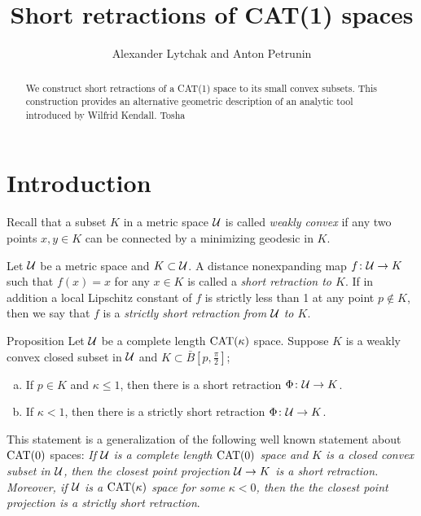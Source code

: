 \documentclass[oneside,a4paper, 12pt]{article}
\begin{document}
\title{Short retractions of CAT(1) spaces}
\author{Alexander Lytchak and Anton Petrunin}
\date{}
\maketitle

\begin{abstract}
We construct short retractions of a CAT(1) space to its small convex subsets.
This construction provides an alternative geometric description of an analytic tool introduced by Wilfrid Kendall. Tosha 
\end{abstract}


\section{Introduction}

Recall that a  subset $K$ in a metric space ${\mathcal{U}}$ is called \emph{weakly convex} if any two points $x,y\in K$ can be connected by a minimizing geodesic in $K$.

Let ${\mathcal{U}}$ be a metric space and $K\subset {\mathcal{U}}$.
A distance nonexpanding map $f\colon{\mathcal{U}}\to K$ such that $f(x)=x$ for any $x\in K$ is called a \emph{short retraction to $K$}.
If in addition a local Lipschitz constant of $f$ is strictly less than 1 at any point $p\notin K$, 
then we say that $f$ is a \emph{strictly short retraction from ${\mathcal{U}}$ to $K$}.

\begin{thm}{Proposition}\label{thm:retraction:Phi}
Let $\mathcal{U}$ be a complete length $\mathrm{CAT}(\kappa)$ space.
Suppose $K$ is a weakly convex closed subset in $\mathcal{U}$ and $K\subset \bar B[p,\tfrac\pi2]$;


\begin{enumerate}[(a)]
 \item If $p\in K$ and $\kappa\le 1$, then there is a short retraction 
$\Phi\colon\mathcal{U}\to K$.
\item If $\kappa<1$, then there is a strictly short retraction 
$\Phi\colon\mathcal{U}\to K$.
\end{enumerate}
\end{thm}

This statement is a generalization of the following well known statement about $\mathrm{CAT}(0)$ spaces:
\emph{If ${\mathcal{U}}$ is a complete length $\mathrm{CAT}(0)$ space and $K$ is a closed convex subset in ${\mathcal{U}}$,
then the closest point projection ${\mathcal{U}}\to K$ is a short retraction.
Moreover, if $\mathcal{U}$ is a $\mathrm{CAT}(\kappa)$ space for some $\kappa<0$, then the the closest point projection is a strictly short retraction}.
\end{document}
